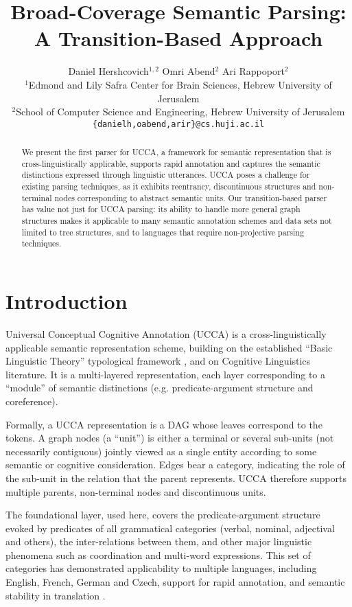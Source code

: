\documentclass[11pt]{article}
\title{Broad-Coverage Semantic Parsing: A Transition-Based Approach}
\author{Daniel Hershcovich$^{1,2}$ \And Omri Abend$^2$ \And Ari Rappoport$^2$ \\
  $^1$Edmond and Lily Safra Center for Brain Sciences, Hebrew University of Jerusalem \\
  $^2$School of Computer Science and Engineering, Hebrew University of Jerusalem \\
  \texttt{\{danielh,oabend,arir\}@cs.huji.ac.il}
}
\date{}
\begin{document}
\maketitle

\begin{abstract}
We present the first parser for UCCA, a framework for semantic representation that is
cross-linguistically applicable, supports rapid annotation and captures the semantic distinctions
expressed through linguistic utterances.
UCCA poses a challenge for existing parsing techniques, as it exhibits reentrancy,
discontinuous structures and non-terminal nodes corresponding to abstract semantic units.
Our transition-based parser has value not just for UCCA parsing:
its ability to handle more general graph structures makes it applicable to
many semantic annotation schemes and data sets not limited to tree structures,
and to languages that require non-projective parsing techniques.
\end{abstract}



\section{Introduction}

Universal Conceptual Cognitive Annotation (UCCA)
is a cross-linguistically applicable semantic representation scheme,
building on the established ``Basic Linguistic Theory'' typological framework
\cite{Dixon:10b,Dixon:10a,Dixon:12}, and on Cognitive Linguistics literature.
It is a multi-layered representation, each layer corresponding to a ``module'' of
semantic distinctions (e.g. predicate-argument structure and coreference).

Formally, a UCCA representation is a DAG whose leaves correspond to the tokens.
A graph nodes (a ``unit'') is either a terminal or several
sub-units (not necessarily contiguous) jointly viewed as a
single entity according to some semantic or cognitive consideration.
Edges bear a category, indicating the role of the sub-unit in the relation that the parent represents.
UCCA therefore supports multiple parents, non-terminal nodes and discontinuous units.

The foundational layer, used here, covers the predicate-argument
structure evoked by predicates of all grammatical categories
(verbal, nominal, adjectival and others), the inter-relations between them,
and other major linguistic phenomena such as coordination and multi-word expressions.
This set of categories has demonstrated applicability to multiple languages, including
English, French, German and Czech, support for rapid annotation, and semantic stability in translation \cite{sulem2015conceptual}.
\end{document}
